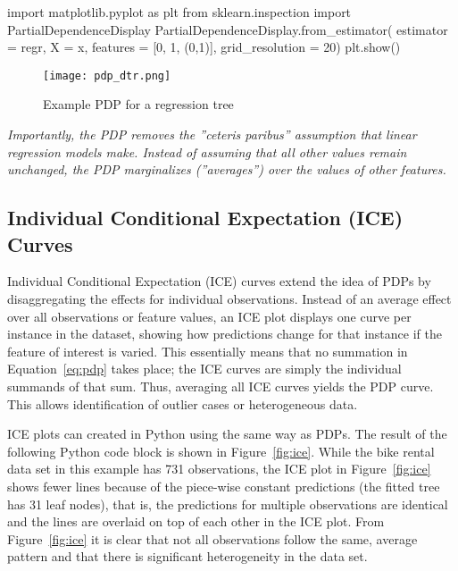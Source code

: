 \begin{samepage}
\begin{pythoncode}
import matplotlib.pyplot as plt
from sklearn.inspection import PartialDependenceDisplay
PartialDependenceDisplay.from_estimator(
    estimator = regr, 
    X = x, features = [0, 1, (0,1)], grid_resolution = 20)
plt.show()
\end{pythoncode}
\end{samepage}

\begin{figure}
\centering
\texttt{[image: pdp\_dtr.png]}
\caption{Example PDP for a regression tree}
\label{fig:pdp}
\end{figure}

\emph{Importantly, the PDP removes the ''ceteris paribus'' assumption that linear regression models make. Instead of assuming that all other values remain unchanged, the PDP marginalizes (''averages'') over the values of other features.}

\subsection{Individual Conditional Expectation (ICE) Curves}

Individual Conditional Expectation (ICE) curves extend the idea of PDPs by disaggregating the effects for individual observations. Instead of an average effect over all observations or feature values, an ICE plot displays one curve per instance in the dataset, showing how predictions change for that instance if the feature of interest is varied. This essentially means that no summation in Equation~\ref{eq:pdp} takes place; the ICE curves are simply the individual summands of that sum. Thus, averaging all ICE curves yields the PDP curve. This allows identification of outlier cases or heterogeneous data. 

ICE plots can created in Python using the same way as PDPs. The result of the following Python code block is shown in Figure~\ref{fig:ice}. While the bike rental data set in this example has 731 observations, the ICE plot in Figure~\ref{fig:ice} shows fewer lines because of the piece-wise constant predictions (the fitted tree has 31 leaf nodes), that is, the predictions for multiple observations are identical and the lines are overlaid on top of each other in the ICE plot. From Figure~\ref{fig:ice} it is clear that not all observations follow the same, average pattern and that there is significant heterogeneity in the data set.

